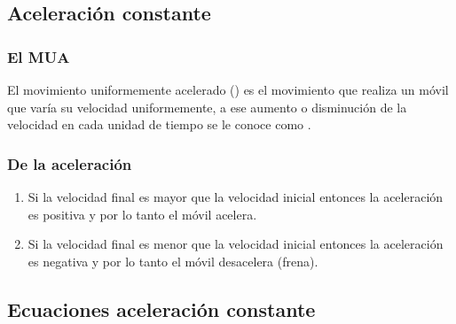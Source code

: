 \documentclass[14pt]{beamer}
\begin{document}
\subsection{Aceleración constante}

\begin{frame}
\frametitle{El MUA}
El movimiento uniformemente acelerado () es el movimiento que realiza un móvil que varía su velocidad uniformemente, a ese aumento o disminución de la velocidad en cada unidad de tiempo se le conoce como .
\end{frame}
\begin{frame}
\frametitle{De la aceleración}
\begin{enumerate}[<+->]
\item Si la velocidad final es mayor que la velocidad inicial entonces la aceleración es positiva y por lo tanto el móvil acelera.
\item Si la velocidad final es menor que la velocidad inicial entonces la aceleración es negativa y por lo tanto el móvil desacelera (frena).
\end{enumerate}
\end{frame}

\subsection{Ecuaciones aceleración constante}
\end{document}
